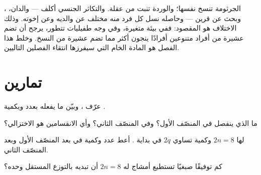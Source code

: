 \begin{remark}\label{rem:g12:meiosis-genetic-shuffling:whysex}
الجرثومة تنسخ نفسها؛ والوردة تنبت من عقلة. والتكاثر الجنسي أكلف ---
والدان، ، وبحث عن قرين --- وحاصله نسل كل فرد منه مختلف عن
والديه وعن إخوته. وذلك الاختلاف هو المقصود: ففي بيئة متغيرة، وفي وجه
طفيليات تتطور، يرجح أن تضم عشيرة من أفراد متنوعين أفرادًا ينجون أكثر مما
تضم عشيرة من النسخ. وخلط هذا الفصل هو المادة الخام التي سيفرزها انتقاء
الفصلين التاليين.
\end{remark}

\section{تمارين}

\begin{exercise}[$\star$]\label{exo:g12:meiosis-genetic-shuffling:1}
عرّف  ، وبيّن ما يفعله  بعدد  وبكمية .
\end{exercise}

\begin{exercise}[$\star$]\label{exo:g12:meiosis-genetic-shuffling:2}
ما الذي ينفصل في المنصّف الأول؟ وفي المنصّف الثاني؟ وأي الانقسامين هو
الاختزالي؟
\end{exercise}

\begin{exercise}[$\star$]\label{exo:g12:meiosis-genetic-shuffling:3}
 لها $2n = 8$ وكمية  تساوي $2q$ في بداية . أعط
عدد  وكمية  في  بعد المنصّف الأول وبعد المنصّف الثاني.
\end{exercise}

\begin{exercise}[$\star$]\label{exo:g12:meiosis-genetic-shuffling:4}
كم توفيقًا صبغيًا تستطيع أمشاج  له $2n = 8$ أن تبديه بالتوزع المستقل
وحده؟
\end{exercise}

